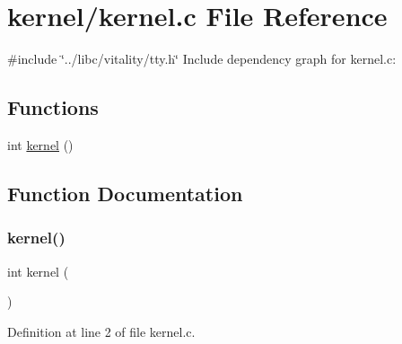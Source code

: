 \hypertarget{a00008}{}\section{kernel/kernel.c File Reference}
\label{a00008}
{\ttfamily \#include \char`\"{}../libc/vitality/tty.\+h\char`\"{}}\newline
Include dependency graph for kernel.\+c\+:
\subsection*{Functions}
\begin{DoxyCompactItemize}
\item 
int \hyperlink{a00008_a4ee3d1f05046b7afc6b4d516bf10667a_a4ee3d1f05046b7afc6b4d516bf10667a}{kernel} ()
\end{DoxyCompactItemize}


\subsection{Function Documentation}
\mbox{\label{a00008_a4ee3d1f05046b7afc6b4d516bf10667a_a4ee3d1f05046b7afc6b4d516bf10667a}} 
\subsubsection{\texorpdfstring{kernel()}{kernel()}}
{\footnotesize\ttfamily int kernel (\begin{DoxyParamCaption}{ }\end{DoxyParamCaption})}



Definition at line 2 of file kernel.\+c.

